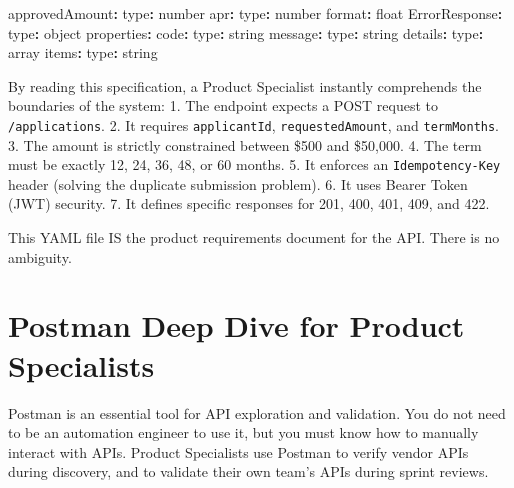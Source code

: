 \documentclass[
  11pt,
  openany,
  oneside]{book}
\newenvironment{Shaded}{}{}
\newcommand{\AttributeTok}[1]{\textcolor[rgb]{0.49,0.56,0.16}{#1}}
\newcommand{\FunctionTok}[1]{\textcolor[rgb]{0.02,0.16,0.49}{#1}}
\newcommand{\KeywordTok}[1]{\textcolor[rgb]{0.00,0.44,0.13}{\textbf{#1}}}
\begin{document}
\begin{Shaded}
\begin{Highlighting}[]
\AttributeTok{        }\FunctionTok{approvedAmount}\KeywordTok{:}
\AttributeTok{          }\FunctionTok{type}\KeywordTok{:}\AttributeTok{ number}
\AttributeTok{        }\FunctionTok{apr}\KeywordTok{:}
\AttributeTok{          }\FunctionTok{type}\KeywordTok{:}\AttributeTok{ number}
\AttributeTok{          }\FunctionTok{format}\KeywordTok{:}\AttributeTok{ float}
\AttributeTok{    }\FunctionTok{ErrorResponse}\KeywordTok{:}
\AttributeTok{      }\FunctionTok{type}\KeywordTok{:}\AttributeTok{ object}
\AttributeTok{      }\FunctionTok{properties}\KeywordTok{:}
\AttributeTok{        }\FunctionTok{code}\KeywordTok{:}
\AttributeTok{          }\FunctionTok{type}\KeywordTok{:}\AttributeTok{ string}
\AttributeTok{        }\FunctionTok{message}\KeywordTok{:}
\AttributeTok{          }\FunctionTok{type}\KeywordTok{:}\AttributeTok{ string}
\AttributeTok{        }\FunctionTok{details}\KeywordTok{:}
\AttributeTok{          }\FunctionTok{type}\KeywordTok{:}\AttributeTok{ array}
\AttributeTok{          }\FunctionTok{items}\KeywordTok{:}
\AttributeTok{            }\FunctionTok{type}\KeywordTok{:}\AttributeTok{ string}
\end{Highlighting}
\end{Shaded}

By reading this specification, a Product Specialist instantly
comprehends the boundaries of the system: 1. The endpoint expects a POST
request to \texttt{/applications}. 2. It requires \texttt{applicantId},
\texttt{requestedAmount}, and \texttt{termMonths}. 3. The amount is
strictly constrained between \$500 and \$50,000. 4. The term must be
exactly 12, 24, 36, 48, or 60 months. 5. It enforces an
\texttt{Idempotency-Key} header (solving the duplicate submission
problem). 6. It uses Bearer Token (JWT) security. 7. It defines specific
responses for 201, 400, 401, 409, and 422.

This YAML file IS the product requirements document for the API. There
is no ambiguity.

\section{Postman Deep Dive for Product
Specialists}\label{postman-deep-dive-for-product-specialists}

Postman is an essential tool for API exploration and validation. You do
not need to be an automation engineer to use it, but you must know how
to manually interact with APIs. Product Specialists use Postman to
verify vendor APIs during discovery, and to validate their own team's
APIs during sprint reviews.
\end{document}

